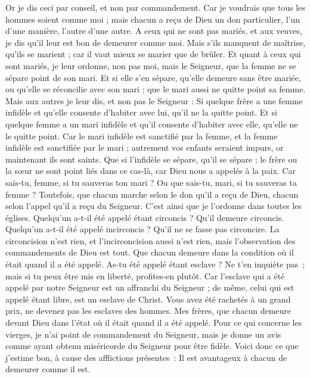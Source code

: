 \begin{multicols}{2}
Or je dis ceci par conseil, et non par commandement.
Car je voudrais que tous les hommes soient comme moi ; mais chacun a reçu de Dieu un don particulier, l'un d’une manière, l’autre d’une autre.
A ceux qui ne sont pas mariés, et aux veuves, je dis qu'il leur est bon de demeurer comme moi.
Mais s'ils manquent de maîtrise, qu'ils se marient ; car il vaut mieux se marier que de brûler.
Et quant à ceux qui sont mariés, je leur ordonne, non pas moi, mais le Seigneur, que la femme ne se sépare point de son mari.
Et si elle s'en sépare, qu'elle demeure sans être mariée, ou qu'elle se réconcilie avec son mari ; que le mari aussi ne quitte point sa femme.
Mais aux autres je leur dis, et non pas le Seigneur : Si quelque frère a une femme infidèle et qu'elle consente d'habiter avec lui, qu'il ne la quitte point.
Et si quelque femme a un mari infidèle et qu'il consente d'habiter avec elle, qu'elle ne le quitte point.
Car le mari infidèle est sanctifié par la femme, et la femme infidèle est sanctifiée par le mari ; autrement vos enfants seraient impurs, or maintenant ils sont saints.
Que si l'infidèle se sépare, qu'il se sépare ; le frère ou la sœur ne sont point liés dans ce cas-là, car Dieu nous a appelés à la paix.
Car sais-tu, femme, si tu sauveras ton mari ? Ou que sais-tu, mari, si tu sauveras ta femme ?
Toutefois, que chacun marche selon le don qu'il a reçu de Dieu, chacun selon l’appel qu’il a reçu du Seigneur. C’est ainsi que je l’ordonne dans toutes les églises.
Quelqu'un a-t-il été appelé étant circoncis ? Qu’il demeure circoncis. Quelqu'un a-t-il été appelé incirconcis ? Qu’il ne se fasse pas circoncire.
La circoncision n'est rien, et l’incirconcision aussi n'est rien, mais l'observation des commandements de Dieu est tout.
Que chacun demeure dans la condition où il était quand il a été appelé.
As-tu été appelé étant esclave ? Ne t'en inquiète pas ; mais si tu peux être mis en liberté, profites-en plutôt.
Car l’esclave qui a été appelé par notre Seigneur est un affranchi du Seigneur ; de même, celui qui est appelé étant libre, est un esclave de Christ.
Vous avez été rachetés à un grand prix, ne devenez pas les esclaves des hommes.
Mes frères, que chacun demeure devant Dieu dans l'état où il était quand il a été appelé.
Pour ce qui concerne les vierges, je n'ai point de commandement du Seigneur, mais je donne un avis comme ayant obtenu miséricorde du Seigneur pour être fidèle.
Voici donc ce que j'estime bon, à cause des afflictions présentes : Il est avantageux à chacun de demeurer comme il est.

\end{multicols}
